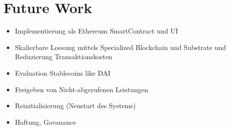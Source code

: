 \section{Future Work}

\begin{itemize}
\item Implementierung als Ethereum SmartContract und UI
\item Skalierbare Loesung mittels Specialized Blockchain und Substrate und Reduzierung Transaktionskosten
\item Evaluation Stablecoins like DAI
\item Freigeben von Nicht-abgerufenen Leistungen
\item Reinitialisierung (Neustart des Systems)
\item Haftung, Gavanance
\end{itemize}